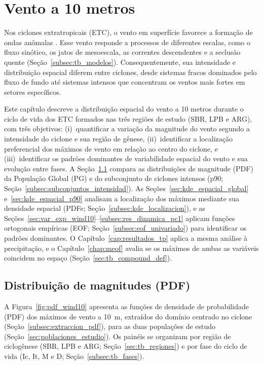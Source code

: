 \chapter{Vento a 10 metros}\label{cap:resultados_wind10}

Nos ciclones extratropicais (ETC), o vento em superfície favorece a formação de ondas anômalas \citep{gramcianinov2023impact}.
Esse vento responde a processos de diferentes escalas, como o fluxo sinótico, os jatos de mesoescala, as correntes descendentes e a seclusão quente (Seção~\ref{subsec:tb_modelos}).
Consequentemente, sua intensidade e distribuição espacial diferem entre ciclones, desde sistemas fracos dominados pelo fluxo de fundo até sistemas intensos que concentram os ventos mais fortes em setores específicos.

Este capítulo descreve a distribuição espacial do vento a 10 metros durante o ciclo de vida dos ETC formados nas três regiões de estudo (SBR, LPB e ARG), com três objetivos: (i)~quantificar a variação da magnitude do vento segundo a intensidade do ciclone e sua região de gênese, (ii)~identificar a localização preferencial dos máximos de vento em relação ao centro do ciclone, e (iii)~identificar os padrões dominantes de variabilidade espacial do vento e sua evolução entre fases.
A Seção~\ref{sec:pdf_wind10} compara as distribuições de magnitude (PDF) da População Global (PG) e do subconjunto de ciclones intensos (p90; Seção~\ref{subsec:subconjuntos_intensidad}).
As Seções~\ref{sec:kde_espacial_global} e~\ref{sec:kde_espacial_p90} analisam a localização dos máximos mediante sua densidade espacial (PDFe; Seção~\ref{subsec:kde_localizacion}), e as Seções~\ref{sec:var_exp_wind10}--\ref{subsec:res_dinamica_pc1} aplicam funções ortogonais empíricas (EOF; Seção~\ref{subsec:eof_univariado}) para identificar os padrões dominantes.
O Capítulo~\ref{cap:resultados_tp} aplica a mesma análise à precipitação, e o Capítulo~\ref{chap:meof} avalia se os máximos de ambas as variáveis coincidem no espaço (Seção~\ref{sec:tb_compound_def}).

\section{Distribuição de magnitudes (PDF)}\label{sec:pdf_wind10}

A Figura~\ref{fig:pdf_wind10} apresenta as funções de densidade de probabilidade (PDF) dos máximos de vento a 10~m, extraídos do domínio centrado no ciclone (Seção~\ref{subsec:extraccion_pdf}), para as duas populações de estudo (Seção~\ref{sec:poblaciones_estudio}).
Os painéis se organizam por região de ciclogênese (SBR, LPB e ARG; Seção~\ref{sec:tb_regiones}) e por fase do ciclo de vida (Ic, It, M e D; Seção~\ref{subsec:tb_fases}).

